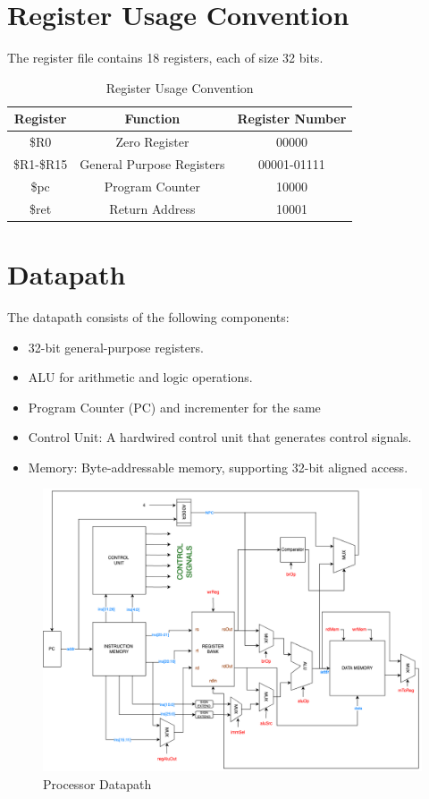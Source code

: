 \documentclass{article}
\begin{document}
\section{Register Usage Convention}

The register file contains 18 registers, each of size 32 bits.

\begin{table}[H]
    \centering
    \begin{tabular}{|c|c|c|}
        \hline
        \textbf{Register} & \textbf{Function} & \textbf{Register Number} \\
        \hline
        \$R0 & Zero Register & 00000 \\
        \$R1-\$R15 & General Purpose Registers & 00001-01111 \\
        \$pc & Program Counter & 10000 \\
        \$ret & Return Address & 10001 \\
        \hline
    \end{tabular}
    \caption{Register Usage Convention}
\end{table}


\section{Datapath}
The datapath consists of the following components:
\begin{itemize}
    \item 32-bit general-purpose registers.
    \item ALU for arithmetic and logic operations.
    \item Program Counter (PC) and incrementer for the same
    \item Control Unit: A hardwired control unit that generates control signals.
    \item Memory: Byte-addressable memory, supporting 32-bit aligned access.
\end{itemize}
\begin{figure}[H]
    \centering
    \includegraphics[width=\textwidth]{datapath.png}
    \caption{Processor Datapath}
\end{figure}
\end{document}
